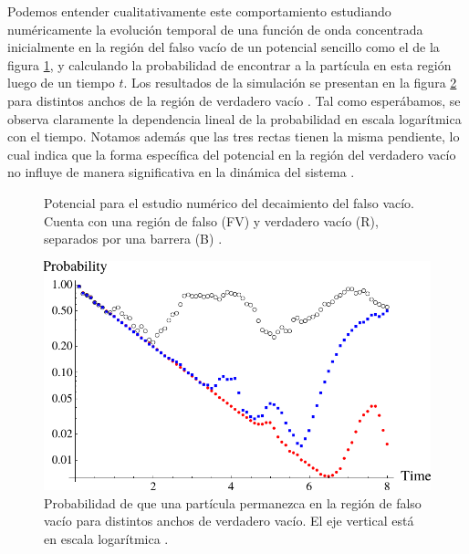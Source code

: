Podemos entender cualitativamente este comportamiento estudiando numéricamente la evolución temporal de una función de onda concentrada inicialmente en la región del falso vacío de un potencial sencillo como el de la figura \ref{fig:potencial_numerico}, y calculando la probabilidad de encontrar a la partícula en esta región luego de un tiempo $t$. Los resultados de la simulación se presentan en la figura \ref{fig:numerico} para distintos anchos de la región de verdadero vacío \cite{Masoumi:2015psa}. Tal como esperábamos, se observa claramente la dependencia lineal de la probabilidad en escala logarítmica con el tiempo. Notamos además que las tres rectas tienen la misma pendiente, lo cual indica que la forma específica del potencial en la región del verdadero vacío no influye de manera significativa en la dinámica del sistema \cite{paranjape2017theory}. 

\begin{figure}[h]
	\centering
	\caption{Potencial para el estudio numérico del decaimiento del falso vacío. Cuenta con una región de falso (FV) y verdadero vacío (R), separados por una barrera (B) \cite{Masoumi:2015psa}.}
	\label{fig:potencial_numerico} 
\end{figure}

\begin{figure}[t]
	\centering
	\includegraphics[scale = 0.4]{FIGURAS/numerico}
	\caption{Probabilidad de que una partícula permanezca en la región de falso vacío para distintos anchos de verdadero vacío. El eje vertical está en escala logarítmica \cite{Masoumi:2015psa}.}
	\label{fig:numerico}
\end{figure}

